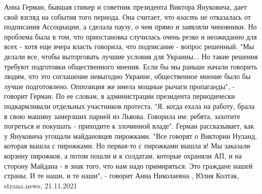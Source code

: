 Анна Герман, бывшая спикер и советник президента Виктора Януковича, дает свой
взгляд на события того периода.  Она считает, что \emph{власть} не отказалась
от подписания Ассоциации, а сделала паузу, о чем прямо и заявляли чиновники. Но
проблема была в том, что приостановка случилась очень резко и неожиданно для
всех - хотя еще вчера власть говорила, что подписание - вопрос решенный.  "Мы
делали все, чтобы выторговать лучшие условия для Украины... Но такие решения
требуют подготовки общественного мнения. Если бы  мы раньше начали говорить
людям, что это соглашение невыгодно Украине, общественное мнение было бы лучше
подготовлено. Оппозиция же имела мощные рычаги пропаганды", - говорит Герман.
По ее словам, в администрации президента периодически подкармливали отдельных
участников протеста. "Я, когда ехала на работу, брала в свою машину замерзших
парней из Львова. Говорила им: ребята, захотите погреться и покушать -
приходите к злочинной владе".  Герман рассказывает, как у Януковича угощали
майдановцев пирожками.  "Все говорят о Виктории Нуланд, которая вышла с
пирожками. Но первая-то с пирожками вышла я! Мы заказали корзину пирожков, а
потом пошли и к солдатам, которые охраняли АП, и на сторону Майдана - в знак
того, что нам надо примиряться. Это граждане нашей страны. И те наши, и те
наши", - говорит Анна Николаевна
, 
Юлия Колтак, strana.news, 21.11.2021
